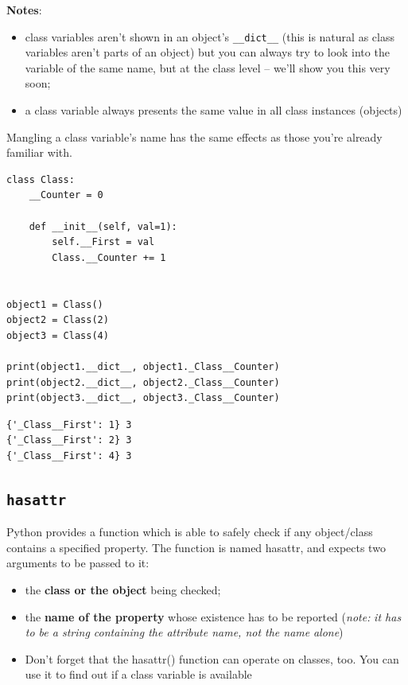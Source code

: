 \documentclass[11pt]{article}
\begin{document}
\textbf{Notes}:
\begin{itemize}
\item class variables aren’t shown in an object’s \texttt{\_\_dict\_\_} (this is
natural as class variables aren’t parts of an object) but you can
always try to look into the variable of the same name, but at the
class level – we’ll show you this very soon;
\item a class variable always presents the same value in all class
instances (objects)
\end{itemize}

Mangling a class variable’s name has the same effects as those you’re
already familiar with.

\begin{verbatim}
class Class:
	__Counter = 0

	def __init__(self, val=1):
		self.__First = val
		Class.__Counter += 1


object1 = Class()
object2 = Class(2)
object3 = Class(4)

print(object1.__dict__, object1._Class__Counter)
print(object2.__dict__, object2._Class__Counter)
print(object3.__dict__, object3._Class__Counter)

\end{verbatim}

\begin{verbatim}
{'_Class__First': 1} 3
{'_Class__First': 2} 3
{'_Class__First': 4} 3
\end{verbatim}


\newpage

\subsection{\texttt{hasattr}}
\label{sec:org2b9a07b}
Python provides a function which is able to safely check if any
object/class contains a specified property. The function is named
hasattr, and expects two arguments to be passed to it:
\begin{itemize}
\item the \textbf{class or the object} being checked;
\item the \textbf{name of the property} whose existence has to be reported (\emph{note:}
\emph{it has to be a string containing the attribute name, not the name}
\emph{alone})
\item Don’t forget that the hasattr() function can operate on classes,
too. You can use it to find out if a class variable is available
\end{itemize}
\end{document}
